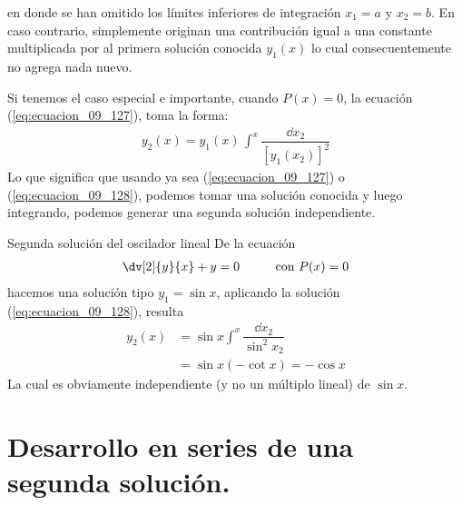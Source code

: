 en donde se han omitido los límites inferiores de integración $x_{1} = a$ y $x_{2} = b$. En caso contrario, simplemente originan una contribución igual a una constante multiplicada por al primera solución conocida $y_{1}(x)$ lo cual consecuentemente no agrega nada nuevo.
\par
Si tenemos el caso especial e importante, cuando $P(x) = 0$, la ecuación (\ref{eq:ecuacion_09_127}), toma la forma:
\begin{align}
y_{2}(x) =  y_{1}(x) \, \int^{x} \dfrac{\dd{x_{2}}}{[y_{1}(x_{2})]^{2}}
\label{eq:ecuacion_09_128}
\end{align}
Lo que significa que usando ya sea (\ref{eq:ecuacion_09_127}) o (\ref{eq:ecuacion_09_128}), podemos tomar una solución conocida y luego integrando, podemos generar una segunda solución independiente.
\par
\begin{ejemplo}{Segunda solución del oscilador lineal}
De la ecuación
\begin{align*}
\dv[2]{y}{x} + y = 0 \hspace{1cm} \mbox{con } P(x) = 0
\end{align*}
hacemos una solución tipo $y_{1} = \sin x$, aplicando la solución (\ref{eq:ecuacion_09_128}), resulta
\begin{align*}
y_{2}(x) &= \sin x \int^{x} \dfrac{\dd{x_{2}}}{\sin^{2} x_{2}} \\
&= \sin x (-\cot x) = - \cos x
\end{align*}
La cual es obviamente independiente (y no un múltiplo lineal) de $\sin x$.
\end{ejemplo}

\section{Desarrollo en series de una segunda solución.}


